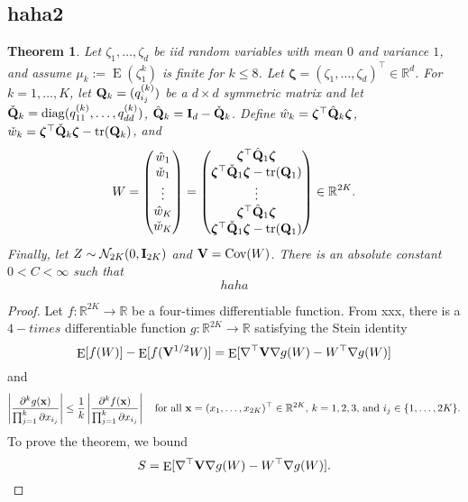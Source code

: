 \documentclass[11pt]{article}
\DeclareMathOperator{\mytr}{tr}
\DeclareMathOperator{\mydiag}{diag}
\DeclareMathOperator{\myE}{E}
\DeclareMathOperator{\myCov}{Cov}
\newcommand{\bfsym}[1]{\ensuremath{\boldsymbol{#1}}}
\def\bzeta{\bfsym {\zeta}}
\theoremstyle{plain}
\newtheorem{theorem}{\quad\quad Theorem}
\theoremstyle{definition}
\theoremstyle{remark}
\begin{document}
\begin{appendices}
    \section{haha2}
\begin{theorem}
    Let $\zeta_1,\ldots,\zeta_d$ be iid random variables with mean $0$ and variance $1$, and assume $\mu_k:= \myE (\zeta_1^k)$ is finite for $k\leq 8$.
    Let $\bzeta=(\zeta_1,\ldots,\zeta_d)^\top\in \mathbb R^d$.
    For $k=1,\ldots, K$, let $\mathbf{Q}_k=(q_{i_j}^{(k)})$ be a $d\times d$ symmetric matrix and let $\check\BQ_k=\mydiag(q_{11}^{(k)},\ldots, q_{dd}^{(k)})$, $\hat{\mathbf{Q}}_k=\mathbf{I}_d-\check{\mathbf{Q}}_k$.
    Define $\hat{w}_k= \bzeta^\top \hat\BQ_k \bzeta$, $\check w_k = \bzeta^\top \check \BQ_k \bzeta -\mytr(\BQ_k)$, and
\begin{equation*}
W=
    \begin{pmatrix}
   \hat w_1\\
   \check w_1\\
   \vdots\\
   \hat w_K\\
   \check w_K
    \end{pmatrix}
    =
    \begin{pmatrix}
        \bzeta^\top \hat \BQ_1 \bzeta
        \\
        \bzeta^\top \check \BQ_1 \bzeta -\mytr (\BQ_1)
        \\
        \vdots\\
        \bzeta^\top \hat \BQ_1 \bzeta
        \\
        \bzeta^\top \check \BQ_1 \bzeta -\mytr (\BQ_1)
        \\
    \end{pmatrix}
    \in \mathbb R^{2K}.
\end{equation*}
Finally, let $Z\sim \mathcal N_{2K} (0,\mathbf{I}_{2K})$ and $\BV = \myCov (W)$. 
There is an absolute constant $0<C<\infty$ such that
\begin{equation*}
    haha
\end{equation*}
\end{theorem}
\begin{proof}
    Let $f:\mathbb R^{2K} \to \mathbb R$ be a four-times differentiable function.
    From xxx, there is a $4-times$ differentiable function $g : \mathbb R^{2K}\to \mathbb R$ satisfying the Stein identity
\begin{equation*}
    \myE [f(W)]    - \myE [f(\BV^{1/2} W)]=
    \myE [\nabla^\top  \BV \nabla g(W) - W^\top \nabla g(W)]
\end{equation*}
and 
\begin{equation*}
    \left| \frac{\partial^k g(\mathbf{x})}{\prod_{j=1}^k \partial x_{i_j}} \right| 
    \leq
    \frac{1}{k}
    \left| \frac{\partial^k f(\mathbf{x})}{\prod_{j=1}^k \partial x_{i_j}} \right|
    \quad
    \text{for all $\mathbf{x}=(x_1,\ldots, x_{2K})^\top \in \mathbb R^{2K}$,
    $k=1,2,3$, and $i_j \in \{1,\ldots, 2K\}$.}
\end{equation*}
To prove the theorem, we bound
\begin{equation*}
    S=\myE [\nabla^\top \BV \nabla g(W) -W^\top \nabla g(W)].
\end{equation*}


\end{proof}
\end{appendices}
\end{document}
